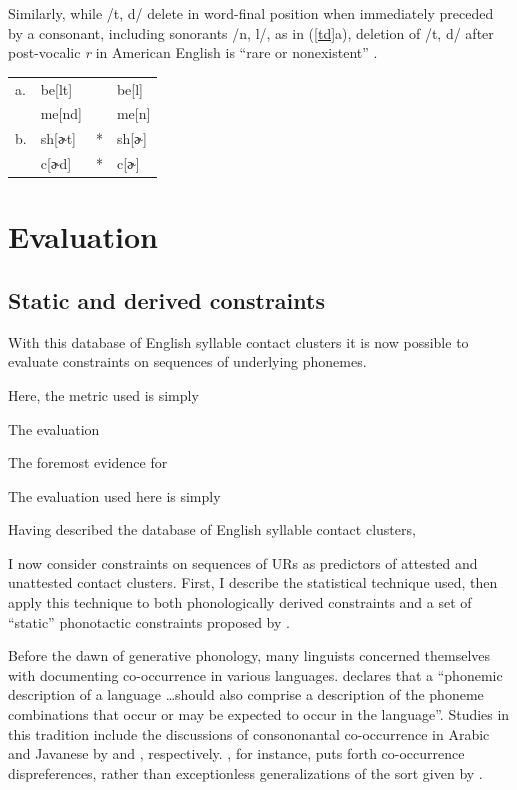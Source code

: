 \noindent Similarly, while /t, d/ delete in word-final position when immediately preceded by a consonant, including sonorants /n, l/, as in (\ref{td}a), deletion of /t, d/ after post-vocalic \emph{r} in American English is ``rare or nonexistent'' \citep[][8]{Guy1980}. 

\begin{example} \label{td}
\begin{tabular}{l l l@{} l}
a. & be[lt]  &   & be[l] \\
   & me[nd]  &   & me[n] \\
b. & sh[ɚt]  & * & sh[ɚ] \\
   & c[ɚd]   & * & c[ɚ]  \\
\end{tabular}
\end{example}

\section{Evaluation}

\subsection{Static and derived constraints}

With this database of English syllable contact clusters it is now possible to evaluate constraints on sequences of underlying phonemes. 

Here, the metric used is simply 

The evaluation 

The foremost evidence for 


The evaluation used here is simply 

Having described the database of English syllable contact clusters, 



I now consider constraints on sequences of URs as predictors of attested and unattested contact clusters. First, I describe the statistical technique used, then apply this technique to both phonologically derived constraints and a set of ``static'' phonotactic constraints proposed by \citet{Pierrehumbert1994}. 

Before the dawn of generative phonology, many linguists concerned themselves with documenting co-occurrence in various languages. \citet[][28]{Vogt1954} declares that a ``phonemic description of a language \ldots should also comprise a description of the phoneme combinations that occur or may be expected to occur in the language''. Studies in this tradition include the discussions of consononantal co-occurrence in Arabic and Javanese by \citet{Greenberg1950} and \citet{Uhlenbeck1950}, respectively. \citeauthor{Uhlenbeck1950}, for instance, puts forth co-occurrence dispreferences, rather than exceptionless generalizations of the sort given by \citet{Greenberg1950}. 


